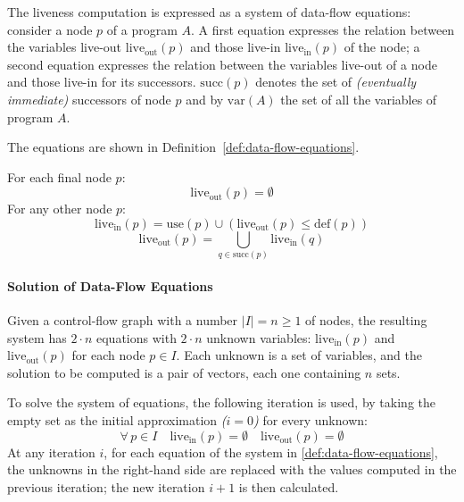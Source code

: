 \documentclass[english]{article}
\begin{document}
The liveness computation is expressed as a system of data-flow equations:
consider a node \(p\) of a program \(A\).
A first equation expresses the relation between the variables live-out \(\text{live}_\text{out}\left( p \right)\) and those live-in \(\text{live}_\text{in}\left( p \right)\) of the node;
a second equation expresses the relation between the variables live-out of a node and those live-in for its successors.
\(\text{succ}\left( p \right)\) denotes the set of \textit{(eventually immediate)} successors of node \(p\) and by \(\text{var}(A)\) the set of all the variables of program \(A\).

The equations are shown in Definition~\ref{def:data-flow-equations}.

\begin{definition}
  \label{def:data-flow-equations}
  For each final node \(p\):
  \[ \text{live}_\text{out}\left( p \right) = \emptyset \]
  For any other node \(p\):
  \[ \text{live}_\text{in}\left( p \right) = \text{use}\left( p \right) \cup \left( \text{live}_\text{out} \left( p \right) \leq \text{def}\left( p \right) \right) \]
  \[ \text{live}_\text{out}\left( p \right) = \bigcup_{q \in \text{succ}\left( p \right)} \text{live}_\text{in}\left( q \right) \]
\end{definition}

\paragraph{Solution of Data-Flow Equations}

Given a control-flow graph with a number \(|I| = n \geq 1\) of nodes, the resulting system has \(2 \cdot n\) equations with \(2 \cdot n\) unknown variables: \(\text{live}_\text{in}\left( p \right)\) and \(\text{live}_\text{out}\left( p \right)\) for each node \(p \in I\).
Each unknown is a set of variables, and the solution to be computed is a pair of vectors, each one containing \(n\) sets.

To solve the system of equations, the following iteration is used, by taking the empty set as the initial approximation \textit{(\(i=0\))} for every unknown:
\[ \forall \, p \in I \quad \text{live}_\text{in}\left( p \right) = \emptyset \quad \text{live}_\text{out} \left( p \right) = \emptyset \]
At any iteration \(i\), for each equation of the system in \ref{def:data-flow-equations}, the unknowns in the right-hand side are replaced with the values computed in the previous iteration;
the new iteration \(i + 1\) is then calculated.
\end{document}
